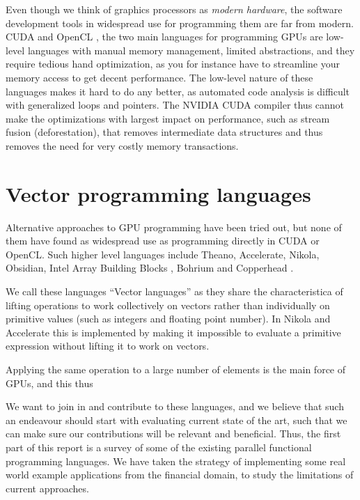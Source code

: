 Even though we think of graphics processors as \textit{modern
  hardware}, the software development tools in widespread use for
programming them are far from modern. CUDA
\cite{nvidia2012programming} and OpenCL \cite{munshi2011opencl}, the
two main languages for programming GPUs are low-level languages with
manual memory management, limited abstractions, and they require
tedious hand optimization, as you for instance have to streamline your
memory access to get decent performance. The low-level nature of these
languages makes it hard to do any better, as automated code analysis
is difficult with generalized loops and pointers. The NVIDIA CUDA
compiler thus cannot make the optimizations with largest impact on
performance, such as stream fusion (deforestation), that removes
intermediate data structures and thus removes the need for very costly
memory transactions.

\section{Vector programming languages}
Alternative approaches to GPU programming have been tried out, but
none of them have found as widespread use as programming directly in
CUDA or OpenCL. Such higher level languages include Theano\cite{bergstra2010theano},
Accelerate\cite{chakravarty2011accelerating},
Nikola\cite{mainland2010nikola}, Obsidian\cite{svensson2011obsidian},
Intel Array Building Blocks \cite{newburn2011intel}, Bohrium
\cite{homepage:bohrium} and Copperhead \cite{Catanzaro2011}.

We call these languages ``Vector languages'' as they share the
characteristica of lifting operations to work collectively on vectors
rather than individually on primitive values (such as integers and
floating point number). In Nikola and Accelerate this is implemented
by making it impossible to evaluate a primitive expression without
lifting it to work on vectors.

Applying the same operation to a large number of elements is the main
force of GPUs, and this thus 

We want to join in and contribute to these languages, and we believe
that such an endeavour should start with evaluating current state of
the art, such that we can make sure our contributions will be relevant
and beneficial. Thus, the first part of this report is a survey of
some of the existing parallel functional programming languages. We
have taken the strategy of implementing some real world example
applications from the financial domain, to study the limitations of
current approaches.

